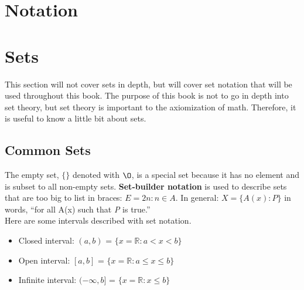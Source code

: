 \documentclass[12pt]{report}
\begin{document}
\section{Notation}
\section{Sets}
\hspace{\parindent}This section will not cover sets in depth, but will cover set notation that will be used throughout this book. The purpose of this book is not to go in depth into set theory, but set theory is important to the axiomization of math. Therefore, it is useful to know a little bit about sets.

\subsection{Common Sets}

\bigskip

The empty set, $\{\}$ denoted with $\O$, is a special set because it has no element and is subset to all non-empty sets.
\textbf{Set-builder notation} is used to describe sets that are too big to list in braces: $E={2n:n \in A}$.
In general: $X=\{A(x):P\}$ in words, ``for all A(x) such that \textit{P} is true.''\\
Here are some intervals described with set notation.
\begin{itemize}
    \item Closed interval: $(a, b)$ = $\{x=\mathbb R:a < x < b\}$
    \item Open interval: $[a, b]$ = $\{x=\mathbb R:a \leq x \leq b\}$
    \item Infinite interval: $(-\infty, b]$ = $\{x=\mathbb R:x \leq b\}$
\end{itemize}
\end{document}
